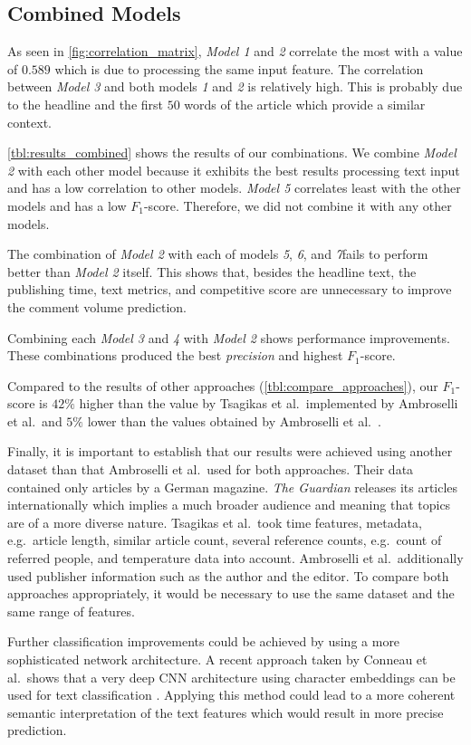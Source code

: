 \subsection{Combined Models}
As seen in \autoref{fig:correlation_matrix}, \textit{Model 1} and \textit{2} correlate the most with a value of $0.589$ which is due to processing the same input feature.
The correlation between \textit{Model 3} and both models \textit{1} and \textit{2} is relatively high. 
This is probably due to the headline and the first $50$ words of the article which provide a similar context.

\autoref{tbl:results_combined} shows the results of our combinations. We combine \textit{Model 2} with each other model because it exhibits the best results processing text input and has a low correlation to other models.
\textit{Model 5} correlates least with the other models and has a low $F_1$-score. Therefore, we did not combine it with any other models.



The combination of \textit{Model 2} with each of models \textit{5}, \textit{6}, and \textit{7}fails to perform better than \textit{Model 2} itself. 
This shows that, besides the headline text, the publishing time, text metrics, and competitive score are unnecessary to improve the comment volume prediction.

Combining each \textit{Model 3} and \textit{4} with \textit{Model 2} shows performance improvements. 
These combinations produced the best \textit{precision} and highest $F_1$-score.

Compared to the results of other approaches (\autoref{tbl:compare_approaches}), our $F_1$-score is $42\%$ higher than the value by Tsagikas et al.\ implemented by Ambroselli et al.\ and $5\%$ lower than the values obtained by Ambroselli et al.\ \cite{ambroselli2018prediction}.



Finally, it is important to establish that our results were achieved using another dataset than that Ambroselli et al.\ used for both approaches.
Their data contained only articles by a German magazine. 
\textit{The Guardian} releases its articles internationally which implies a much broader audience and meaning that topics are of a more diverse nature.
Tsagikas et al.\ took time features, metadata, e.g.\ article length, similar article count, several reference counts, e.g.\ count of referred people, and temperature data into account.
Ambroselli et al.\ additionally used publisher information such as the author and the editor.
To compare both approaches appropriately, it would be necessary to use the same dataset and the same range of features.

Further classification improvements could be achieved by using a more sophisticated network architecture. 
A recent approach taken by Conneau et al.\ shows that a very deep CNN architecture using character embeddings can be used for text classification \cite{conneau2016very}. 
Applying this method could lead to a more coherent semantic interpretation of the text features which would result in more precise prediction.